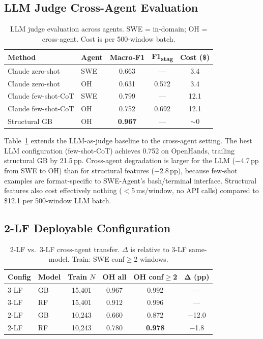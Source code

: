 \documentclass[11pt,a4paper]{article}
\begin{document}
\subsection{LLM Judge Cross-Agent Evaluation}
\label{sec:llm-cross}

\begin{table}[t]
\centering
\caption{LLM judge evaluation across agents. SWE = in-domain; OH = cross-agent. Cost is per 500-window batch.}
\label{tab:llm-judge}
\begin{tabular}{llccc}
\toprule
\textbf{Method} & \textbf{Agent} & \textbf{Macro-F1} & \textbf{F1\textsubscript{stag}} & \textbf{Cost (\$)} \\
\midrule
Claude zero-shot & SWE & 0.663 & --- & 3.4 \\
Claude zero-shot & OH & 0.631 & 0.572 & 3.4 \\
Claude few-shot-CoT & SWE & 0.799 & --- & 12.1 \\
Claude few-shot-CoT & OH & 0.752 & 0.692 & 12.1 \\
\midrule
Structural GB & OH & \textbf{0.967} & --- & $\sim$0 \\
\bottomrule
\end{tabular}
\end{table}

Table~\ref{tab:llm-judge} extends the LLM-as-judge baseline to the cross-agent setting.
The best LLM configuration (few-shot-CoT) achieves 0.752 on OpenHands, trailing structural GB by 21.5\,pp.
Cross-agent degradation is larger for the LLM ($-$4.7\,pp from SWE to OH) than for structural features ($-$2.8\,pp), because few-shot examples are format-specific to SWE-Agent's bash/terminal interface.
Structural features also cost effectively nothing ($<$5\,ms/window, no API calls) compared to \$12.1 per 500-window LLM batch.

\subsection{2-LF Deployable Configuration}
\label{sec:2lf}

\begin{table}[t]
\centering
\caption{2-LF vs.\ 3-LF cross-agent transfer. $\Delta$ is relative to 3-LF same-model. Train: SWE conf$\geq$2 windows.}
\label{tab:2lf}
\begin{tabular}{llcccc}
\toprule
\textbf{Config} & \textbf{Model} & \textbf{Train $N$} & \textbf{OH all} & \textbf{OH conf$\geq$2} & $\boldsymbol{\Delta}$ \textbf{(pp)} \\
\midrule
3-LF & GB & 15{,}401 & 0.967 & 0.992 & --- \\
3-LF & RF & 15{,}401 & 0.912 & 0.996 & --- \\
\midrule
2-LF & GB & 10{,}243 & 0.660 & 0.872 & $-$12.0 \\
2-LF & RF & 10{,}243 & 0.780 & \textbf{0.978} & $-$1.8 \\
\bottomrule
\end{tabular}
\end{table}
\end{document}
